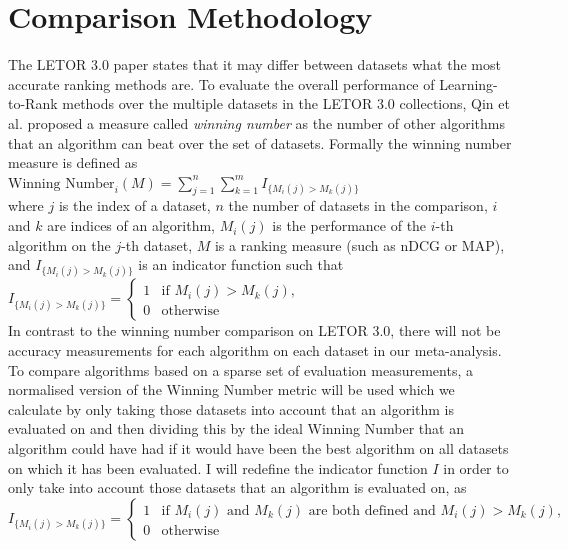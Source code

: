 \section{Comparison Methodology}
The LETOR 3.0 paper \cite{Qin2010} states that it may differ between datasets what the most accurate ranking methods are. To evaluate the overall performance of Learning-to-Rank methods over the multiple datasets in the LETOR 3.0 collections, Qin et al. \cite{Qin2010} proposed a measure called \emph{winning number} as the number of other algorithms that an algorithm can beat over the set of datasets. Formally the winning number measure is defined as\\

$\text{Winning Number}_i(M) = \sum\nolimits_{j=1}^n \sum\nolimits_{k=1}^m I_{\{M_i(j)>M_k(j)\}}$\\

where $j$ is the index of a dataset, $n$ the number of datasets in the comparison, $i$ and $k$ are indices of an algorithm, $M_i(j)$ is the performance of the $i$-th algorithm on the $j$-th dataset, $M$ is a ranking measure (such as \ac{nDCG} or \ac{MAP}), and $I_{\{M_i(j)>M_k(j)\}}$ is an indicator function such that\\

$I_{\{M_i(j)>M_k(j)\}} = \begin{cases}
1 & \text{if } M_i(j) > M_k(j), \\
0 & \text{otherwise}
\end{cases}$\\

In contrast to the winning number comparison on LETOR 3.0, there will not be accuracy measurements for each algorithm on each dataset in our meta-analysis. To compare algorithms based on a sparse set of evaluation measurements, a normalised version of the Winning Number metric will be used which we calculate by only taking those datasets into account that an algorithm is evaluated on and then dividing this by the ideal Winning Number that an algorithm could have had if it would have been the best algorithm on all datasets on which it has been evaluated. I will redefine the indicator function $I$ in order to only take into account those datasets that an algorithm is evaluated on, as \\

$I_{\{M_i(j)>M_k(j)\}} = \begin{cases}
1 & \text{if } M_i(j) \text{ and } M_k(j) \text{ are both defined and } M_i(j) > M_k(j), \\
0 & \text{otherwise}
\end{cases}$\\

